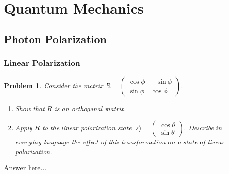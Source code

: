 \documentclass[12pt]{article}
\newenvironment{answer}
    {\begin{adjustwidth}{0pt}{0pt}}
    {\end{adjustwidth}}
\newtheorem{problem}{Problem}
\theoremstyle{remark}  %
\begin{document}
\setlength{\abovecaptionskip}{0pt} %

\rhead{\today}

\section{Quantum Mechanics}
\subsection{Photon Polarization}
\subsubsection{Linear Polarization}
    \begin{problem}
        Consider the matrix $R=\begin{pmatrix}
            \cos\phi & -\sin\phi \\
            \sin\phi & \cos\phi
        \end{pmatrix}$.
        \begin{enumerate}[label=(\alph*)]
            \item Show that $R$ is an orthogonal matrix.
            \item Apply $R$ to the linear polarization state $|s\rangle = \begin{pmatrix}
                \cos\theta \\
                \sin\theta
            \end{pmatrix}$. Describe in everyday language the effect of this transformation on a state of linear polarization.
        \end{enumerate}
    \end{problem}
    \begin{answer}
        Answer here...
    \end{answer}
\end{document}
